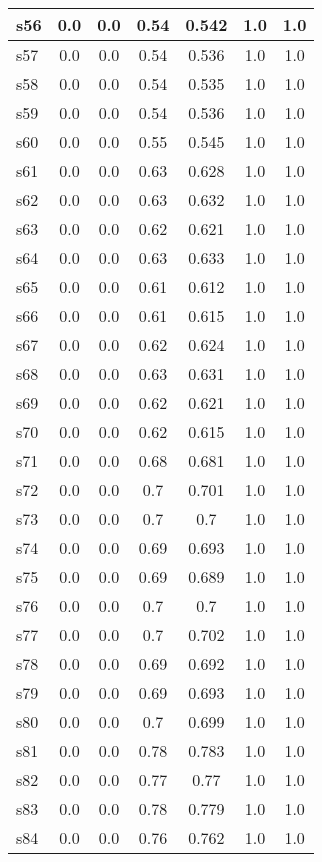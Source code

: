 \documentclass{article}
\begin{document}
\begin{tabular}{|l|c|c|c|c|c|c|}
\hline
s56 &0.0 & 0.0 & 0.54 & 0.542 & 1.0 & 1.0\\
\hline
s57 &0.0 & 0.0 & 0.54 & 0.536 & 1.0 & 1.0\\
\hline
s58 &0.0 & 0.0 & 0.54 & 0.535 & 1.0 & 1.0\\
\hline
s59 &0.0 & 0.0 & 0.54 & 0.536 & 1.0 & 1.0\\
\hline
s60 &0.0 & 0.0 & 0.55 & 0.545 & 1.0 & 1.0\\
\hline
s61 &0.0 & 0.0 & 0.63 & 0.628 & 1.0 & 1.0\\
\hline
s62 &0.0 & 0.0 & 0.63 & 0.632 & 1.0 & 1.0\\
\hline
s63 &0.0 & 0.0 & 0.62 & 0.621 & 1.0 & 1.0\\
\hline
s64 &0.0 & 0.0 & 0.63 & 0.633 & 1.0 & 1.0\\
\hline
s65 &0.0 & 0.0 & 0.61 & 0.612 & 1.0 & 1.0\\
\hline
s66 &0.0 & 0.0 & 0.61 & 0.615 & 1.0 & 1.0\\
\hline
s67 &0.0 & 0.0 & 0.62 & 0.624 & 1.0 & 1.0\\
\hline
s68 &0.0 & 0.0 & 0.63 & 0.631 & 1.0 & 1.0\\
\hline
s69 &0.0 & 0.0 & 0.62 & 0.621 & 1.0 & 1.0\\
\hline
s70 &0.0 & 0.0 & 0.62 & 0.615 & 1.0 & 1.0\\
\hline
s71 &0.0 & 0.0 & 0.68 & 0.681 & 1.0 & 1.0\\
\hline
s72 &0.0 & 0.0 & 0.7 & 0.701 & 1.0 & 1.0\\
\hline
s73 &0.0 & 0.0 & 0.7 & 0.7 & 1.0 & 1.0\\
\hline
s74 &0.0 & 0.0 & 0.69 & 0.693 & 1.0 & 1.0\\
\hline
s75 &0.0 & 0.0 & 0.69 & 0.689 & 1.0 & 1.0\\
\hline
s76 &0.0 & 0.0 & 0.7 & 0.7 & 1.0 & 1.0\\
\hline
s77 &0.0 & 0.0 & 0.7 & 0.702 & 1.0 & 1.0\\
\hline
s78 &0.0 & 0.0 & 0.69 & 0.692 & 1.0 & 1.0\\
\hline
s79 &0.0 & 0.0 & 0.69 & 0.693 & 1.0 & 1.0\\
\hline
s80 &0.0 & 0.0 & 0.7 & 0.699 & 1.0 & 1.0\\
\hline
s81 &0.0 & 0.0 & 0.78 & 0.783 & 1.0 & 1.0\\
\hline
s82 &0.0 & 0.0 & 0.77 & 0.77 & 1.0 & 1.0\\
\hline
s83 &0.0 & 0.0 & 0.78 & 0.779 & 1.0 & 1.0\\
\hline
s84 &0.0 & 0.0 & 0.76 & 0.762 & 1.0 & 1.0\\

\end{tabular}
\end{document}
